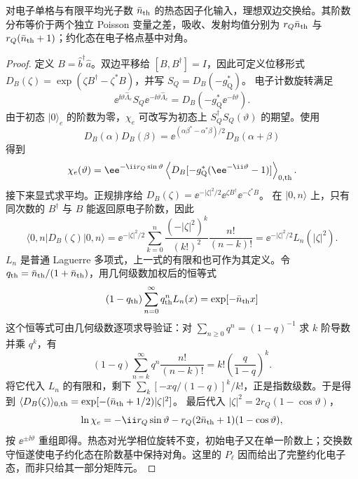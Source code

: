 \begin{proposition}[热光输入的交换特征函数]
对电子单格与有限平均光子数 $\bar n_{\rm th}$ 的热态因子化输入，理想双边交换给。其阶数分布等价于两个独立 Poisson 变量之差，吸收、发射均值分别为 $r_Q\bar n_{\rm th}$ 与 $r_Q(\bar n_{\rm th}+1)$；约化态在电子格点基中对角。
\end{proposition}
\begin{proof}
定义 $B=\hat b^\dagger\hat a$。双边平移给 $[B,B^\dagger]=I$，因此可定义位移形式
$D_B(\zeta)=\exp(\zeta B^\dagger-\zeta^*B)$，并写 $S_Q=D_B(-g_{\mathrm Q}^*)$。
电子计数旋转满足
\begin{equation*}
 \ee^{\ii\vartheta\hat\Lambda_e}S_Q\ee^{-\ii\vartheta\hat\Lambda_e}
 =D_B(-g_{\mathrm Q}^*\ee^{-\ii\vartheta}).
\end{equation*}
由于初态 $|0\rangle_e$ 的阶数为零，$\chi_e$ 可改写为初态上 $S_Q^\dagger S_Q(\vartheta)$ 的期望。使用
\begin{equation*}
 D_B(\alpha)D_B(\beta)
 =\ee^{(\alpha\beta^*-\alpha^*\beta)/2}D_B(\alpha+\beta)
\end{equation*}
得到
\begin{equation*}
 \chi_e(\vartheta)=\ee^{-\ii r_Q\sin\vartheta}
 \left\langle D_B[-g_{\mathrm Q}^*(\ee^{-\ii\vartheta}-1)]\right\rangle_{0,\rm th}.
\end{equation*}
接下来显式求平均。正规排序给
$D_B(\zeta)=\ee^{-|\zeta|^2/2}\ee^{\zeta B^\dagger}\ee^{-\zeta^*B}$。
在 $|0,n\rangle$ 上，只有同次数的 $B^\dagger$ 与 $B$ 能返回原电子阶数，因此
\begin{equation*}
 \langle0,n|D_B(\zeta)|0,n\rangle
 =\ee^{-|\zeta|^2/2}\sum_{k=0}^n
 \frac{(-|\zeta|^2)^k}{(k!)^2}\frac{n!}{(n-k)!}
 =\ee^{-|\zeta|^2/2}L_n(|\zeta|^2).
\end{equation*}
$L_n$ 是普通 Laguerre 多项式，上一式的有限和也可作为其定义。令 $q_{\rm th}=\bar n_{\rm th}/(1+\bar n_{\rm th})$，用几何级数加权后的恒等式
\begin{equation*}
 (1-q_{\rm th})\sum_{n=0}^\infty q_{\rm th}^nL_n(x)
 =\exp[-\bar n_{\rm th}x]
\end{equation*}
这个恒等式可由几何级数逐项求导验证：对 $\sum_{n\ge0}q^n=(1-q)^{-1}$ 求 $k$ 阶导数并乘 $q^k$，有
\begin{equation*}
 (1-q)\sum_{n=k}^{\infty}q^n\frac{n!}{(n-k)!}
 =k!\left(\frac{q}{1-q}\right)^k.
\end{equation*}
将它代入 $L_n$ 的有限和，剩下 $\sum_k[-xq/(1-q)]^k/k!$，正是指数级数。于是得到 $\langle D_B(\zeta)\rangle_{0,\rm th}
=\exp[-(\bar n_{\rm th}+1/2)|\zeta|^2]$。
最后代入 $|\zeta|^2=2r_Q(1-\cos\vartheta)$，
\begin{equation*}
 \ln\chi_e=-\ii r_Q\sin\vartheta
 -r_Q(2\bar n_{\rm th}+1)(1-\cos\vartheta),
\end{equation*}
按 $\ee^{\pm\ii\vartheta}$ 重组即得。热态对光学相位旋转不变，初始电子又在单一阶数上；交换数守恒遂使电子约化态在阶数基中保持对角。这里的 $P_\ell$ 因而给出了完整约化电子态，而非只给其一部分矩阵元。
\end{proof}


